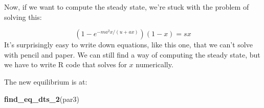 \documentclass[
]{book}
\newenvironment{Shaded}{\begin{snugshade}}{\end{snugshade}}
\newcommand{\AttributeTok}[1]{\textcolor[rgb]{0.13,0.29,0.53}{#1}}
\newcommand{\ControlFlowTok}[1]{\textcolor[rgb]{0.13,0.29,0.53}{\textbf{#1}}}
\newcommand{\DecValTok}[1]{\textcolor[rgb]{0.00,0.00,0.81}{#1}}
\newcommand{\FunctionTok}[1]{\textcolor[rgb]{0.13,0.29,0.53}{\textbf{#1}}}
\newcommand{\NormalTok}[1]{#1}
\newcommand{\OtherTok}[1]{\textcolor[rgb]{0.56,0.35,0.01}{#1}}
\newcommand{\SpecialCharTok}[1]{\textcolor[rgb]{0.81,0.36,0.00}{\textbf{#1}}}
\begin{document}
Now, if we want to compute the steady state, we're stuck with the problem of solving this:

\[(1-e^{-m a^2 x/(u + a x)}) (1-x) = sx\]
It's surprisingly easy to write down equations, like this one, that we can't solve with pencil and paper. We can still find a way of computing the steady state, but we have to write R code that solves for \(x\) numerically.

\begin{Shaded}
\end{Shaded}

The new equilibrium is at:

\begin{Shaded}
\begin{Highlighting}[]
\FunctionTok{find\_eq\_dts\_2}\NormalTok{(par3)}
\end{Highlighting}
\end{Shaded}
\end{document}
